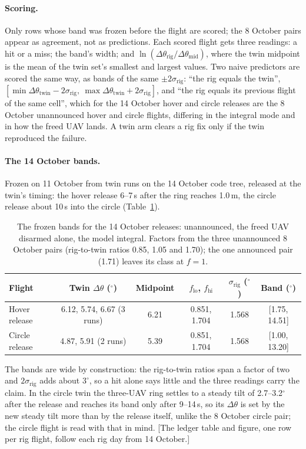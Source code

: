 \paragraph{Scoring.} Only rows whose band was frozen before the flight are scored; the 8 October pairs appear
as agreement, not as predictions. Each scored flight gets three readings: a hit or a miss; the band's width;
and $\ln(\Delta\theta_{\mathrm{rig}}/\Delta\theta_{\mathrm{mid}})$, where the twin midpoint is the mean of the
twin set's smallest and largest values. Two naive predictors are scored the same way, as bands of the same
$\pm2\sigma_{\mathrm{rig}}$: ``the rig equals the twin'',
$[\min\Delta\theta_{\mathrm{twin}}-2\sigma_{\mathrm{rig}},\ \max\Delta\theta_{\mathrm{twin}}+2\sigma_{\mathrm{rig}}]$,
and ``the rig equals its previous flight of the same cell'', which for the 14 October hover and circle releases
are the 8 October unannounced hover and circle flights, differing in the integral mode and in how the freed
UAV lands. A twin arm clears a rig fix only if the twin reproduced the failure.

\paragraph{The 14 October bands.} Frozen on 11 October from twin runs on the 14 October code tree, released at
the twin's timing: the hover release 6--7\,s after the ring reaches 1.0\,m, the circle release about 10\,s into
the circle (Table~\ref{tab:ledger_bands}).

\begin{table}[h]
\centering
\small
\caption{The frozen bands for the 14 October releases: unannounced, the freed UAV disarmed alone, the model
integral. Factors from the three unannounced 8 October pairs (rig-to-twin ratios 0.85, 1.05 and 1.70); the one
announced pair (1.71) leaves its class at $f=1$.}
\label{tab:ledger_bands}
\begin{tabularx}{\textwidth}{>{\raggedright\arraybackslash}Xccccc}
\toprule
Flight & Twin $\Delta\theta$ ($^\circ$) & Midpoint & $f_{\mathrm{lo}}$, $f_{\mathrm{hi}}$ & $\sigma_{\mathrm{rig}}$ ($^\circ$) & Band ($^\circ$) \\
\midrule
Hover release & 6.12, 5.74, 6.67 (3 runs) & 6.21 & 0.851, 1.704 & 1.568 & [1.75, 14.51] \\
Circle release & 4.87, 5.91 (2 runs) & 5.39 & 0.851, 1.704 & 1.568 & [1.00, 13.20] \\
\bottomrule
\end{tabularx}
\end{table}

The bands are wide by construction: the rig-to-twin ratios span a factor of two and $2\sigma_{\mathrm{rig}}$
adds about $3^\circ$, so a hit alone says little and the three readings carry the claim. In the circle twin
the three-UAV ring settles to a steady tilt of 2.7--3.2$^\circ$ after the release and reaches its band only
after 9--14\,s, so its $\Delta\theta$ is set by the new steady tilt more than by the release itself, unlike
the 8 October circle pair; the circle flight is read with that in mind. [The ledger table and figure, one row
per rig flight, follow each rig day from 14 October.]
